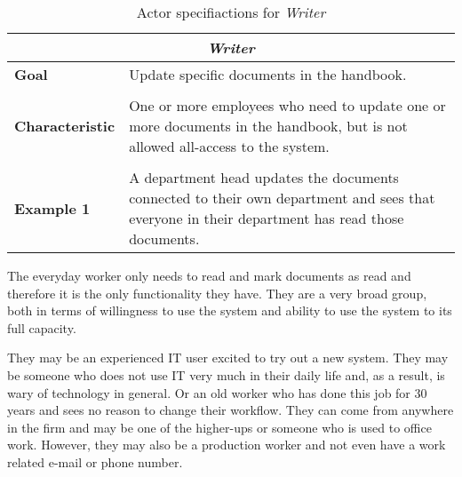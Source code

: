 \begin{table}[H]
	\centering
	\begin{tabular}{l p{11.3cm}}
		\hline
		\multicolumn{2}{c}{\textbf{\textit{Writer}}}\\
		\hline

		\textbf{Goal} & Update specific documents in the handbook. \\
	 	 &  \\

		\textbf{Characteristic} &  One or more employees who need to update one or more documents in the handbook, but is not allowed all-access to the system. \\
		 &  \\

		\textbf{Example 1}
		& A department head updates the documents connected to their own department and sees that everyone in their department has read those documents.\\

		\hline
	\end{tabular}
	\caption{Actor specifiactions for \textit{Writer}}\label{tab:Actor-write}
\end{table}

The everyday worker only needs to read and mark documents as read and therefore it is the only functionality they have.
They are a very broad group, both in terms of willingness to use the system and ability to use the system to its full capacity.

They may be an experienced IT user excited to try out a new system.
They may be someone who does not use IT very much in their daily life and, as a result, is wary of technology in general.
Or an old worker who has done this job for 30 years and sees no reason to change their workflow.
They can come from anywhere in the firm and may be one of the higher-ups or someone who is used to office work.
However, they may also be a production worker and not even have a work related e-mail or phone number.

